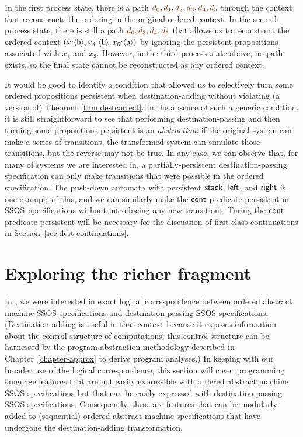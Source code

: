 In the
first process state, there is a path 
$\lf{d_0}, \lf{d_1}, \lf{d_2}, \lf{d_3}, \lf{d_4}, \lf{d_5}$ through
the context that reconstructs the ordering in the original ordered context.
In the second process state, there is still a path 
$\lf{d_0}, \lf{d_3}, \lf{d_4}, \lf{d_5}$ that
allows us to reconstruct the ordered context
$(x{:}\langle {\sf b} \rangle,
  x_4{:}\langle {\sf b} \rangle, x_5{:}\langle {\sf a} \rangle)$ by ignoring the persistent
propositions associated with $x_1$ and $x_3$. 
However, in the third process state above, no path exists, so the final
state cannot be reconstructed as any ordered context. 

It would be good to identify a condition that allowed us to
selectively turn some ordered propositions persistent when
destination-adding without violating (a version of)
Theorem~\ref{thm:destcorrect}. In the absence of such a generic
condition, it is still straightforward to see that performing
destination-passing and then turning some propositions persistent is
an {\it abstraction}: if the original system can make a series of
transitions, the transformed system can simulate those transitions,
but the reverse may not be true. In any case, we can observe that, for
many of systems we are interested in, a partially-persistent
destination-passing specification can only make transitions that were
possible in the ordered specification.  The push-down automata with
persistent ${\sf stack}$, ${\sf left}$, and ${\sf right}$ is one
example of this, and we can similarly make the ${\sf cont}$ predicate
persistent in SSOS~specifications without introducing any new
transitions. Turing the ${\sf cont}$ predicate persistent will 
be necessary for the discussion of first-class
continuations in Section~\ref{sec:dest-continuations}.

\section{Exploring the richer fragment}

In \cite{simmons11logical}, we were interested in exact logical
correspondence between ordered abstract machine SSOS specifications
and destination-passing SSOS specifications. (Destination-adding is
useful in that context because it exposes information about the
control structure of computations; this control structure can be
harnessed by the program abstraction methodology described in
Chapter~\ref{chapter-approx} to derive program analyses.) In keeping
with our broader use of the logical correspondence, this section will
cover programming language features that are not easily expressible
with ordered abstract machine SSOS specifications but that can be
easily expressed with destination-passing SSOS
specifications. Consequently, these are features that can be modularly
added to (sequential) ordered abstract machine specifications that
have undergone the destination-adding transformation.

